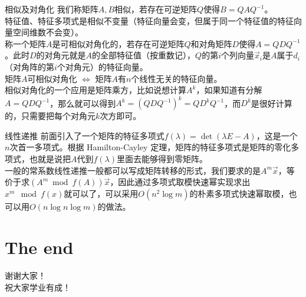 \documentclass{beamer}
\begin{document}
\begin{frame}{相似及对角化}
	我们称矩阵$A, B$相似，若存在可逆矩阵$Q$使得$B = QAQ^{-1}$。\\
	
	特征值、特征多项式是相似不变量（特征向量会变，但属于同一个特征值的特征向量空间维数不会变）。\\
	
	称一个矩阵$A$是可相似对角化的，若存在可逆矩阵$Q$和对角矩阵$D$使得$A = QDQ^{-1}$。此时$D$的对角元就是$A$的全部特征值（按重数记），$Q$的第$i$个列向量$\vec{x}_i$是$A$属于$d_i$（对角阵的第$i$个对角元）的特征向量。\\
	
	矩阵$A$可相似对角化 $\Leftrightarrow$ 矩阵$A$有$n$个线性无关的特征向量。\\
	
	相似对角化的一个应用是矩阵乘方，比如说想计算$A^k$，如果知道有分解$A = QDQ^{-1}$，那么就可以得到$A^k = (QDQ^{-1})^k = QD^kQ^{-1}$，而$D^k$是很好计算的，只需要把每个对角元$k$次方即可。
\end{frame}
\begin{frame}{线性递推}
	前面引入了一个矩阵的特征多项式$f(\lambda) = \det(\lambda E - A)$，这是一个$n$次首一多项式。根据 Hamilton-Cayley 定理，矩阵的特征多项式是矩阵的零化多项式，也就是说把$A$代到$f(\lambda)$里面去能够得到零矩阵。\\
	
	一般的常系数线性递推一般都可以写成矩阵转移的形式，我们要求的是$A^m\vec{x}$，等价于求$(A^m \bmod f(A))\vec{x}$，因此通过多项式取模快速幂实现求出$x^m \mod f(x)$就可以了，可以采用$O(n^2\log m)$的朴素多项式快速幂取模，也可以用$O(n\log n \log m)$的做法。
\end{frame}

\section{The end}
\begin{frame}
	\begin{center}
		{\huge 谢谢大家！\\  \large 祝大家学业有成！}
	\end{center}
\end{frame}
\end{document}
